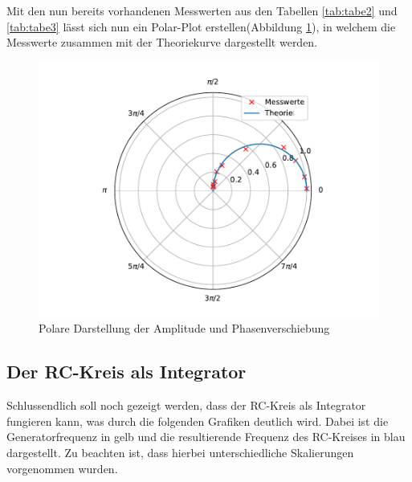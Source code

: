 \noindent Mit den nun bereits vorhandenen Messwerten aus den Tabellen \ref{tab:tabe2}
und \ref{tab:tabe3} lässt sich nun ein Polar-Plot erstellen(Abbildung \ref{fig:polar}),
in welchem die Messwerte zusammen mit der Theoriekurve dargestellt werden.
\begin{figure}[H]
  \centering
  \includegraphics{plot4.pdf}
  \caption{Polare Darstellung der Amplitude und Phasenverschiebung}
  \label{fig:polar}
\end{figure}

\subsection{Der RC-Kreis als Integrator}
Schlussendlich soll noch gezeigt werden, dass der RC-Kreis als Integrator
fungieren kann, was durch die folgenden Grafiken deutlich wird. Dabei ist die
Generatorfrequenz in gelb und die resultierende Frequenz des RC-Kreises in blau
dargestellt. Zu beachten ist, dass hierbei unterschiedliche Skalierungen
vorgenommen wurden.

